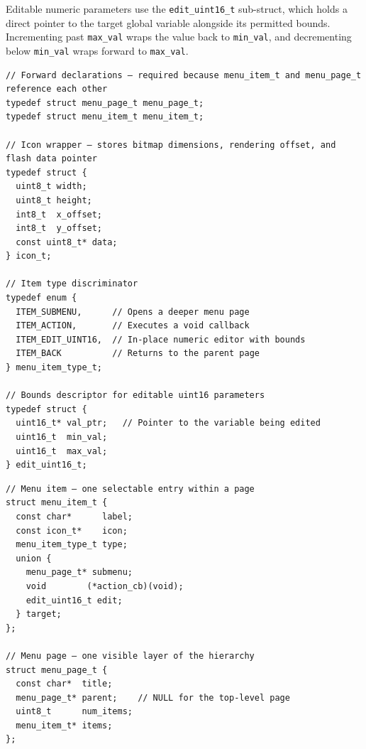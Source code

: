 Editable numeric parameters use the \texttt{edit\_uint16\_t} sub-struct, which holds a direct pointer to the target global variable alongside its permitted bounds.
Incrementing past \texttt{max\_val} wraps the value back to \texttt{min\_val}, and decrementing below \texttt{min\_val} wraps forward to \texttt{max\_val}.

\begin{longlisting}
\begin{verbatim}
// Forward declarations — required because menu_item_t and menu_page_t reference each other
typedef struct menu_page_t menu_page_t;
typedef struct menu_item_t menu_item_t;

// Icon wrapper — stores bitmap dimensions, rendering offset, and flash data pointer
typedef struct {
  uint8_t width;
  uint8_t height;
  int8_t  x_offset;
  int8_t  y_offset;
  const uint8_t* data;
} icon_t;

// Item type discriminator
typedef enum {
  ITEM_SUBMENU,      // Opens a deeper menu page
  ITEM_ACTION,       // Executes a void callback
  ITEM_EDIT_UINT16,  // In-place numeric editor with bounds
  ITEM_BACK          // Returns to the parent page
} menu_item_type_t;

// Bounds descriptor for editable uint16 parameters
typedef struct {
  uint16_t* val_ptr;   // Pointer to the variable being edited
  uint16_t  min_val;
  uint16_t  max_val;
} edit_uint16_t;
\end{verbatim}
\caption{Supporting type definitions: icon wrapper, item type discriminator, and bounds descriptor.}
\label{lst:menu_types_supporting}
\end{longlisting}

\begin{longlisting}
\begin{verbatim}
// Menu item — one selectable entry within a page
struct menu_item_t {
  const char*      label;
  const icon_t*    icon;
  menu_item_type_t type;
  union {
    menu_page_t* submenu;
    void        (*action_cb)(void);
    edit_uint16_t edit;
  } target;
};

// Menu page — one visible layer of the hierarchy
struct menu_page_t {
  const char*  title;
  menu_page_t* parent;    // NULL for the top-level page
  uint8_t      num_items;
  menu_item_t* items;
};
\end{verbatim}
\caption{Composite types: \texttt{menu\_item\_t} and \texttt{menu\_page\_t}.}
\label{lst:menu_types_composite}
\end{longlisting}

